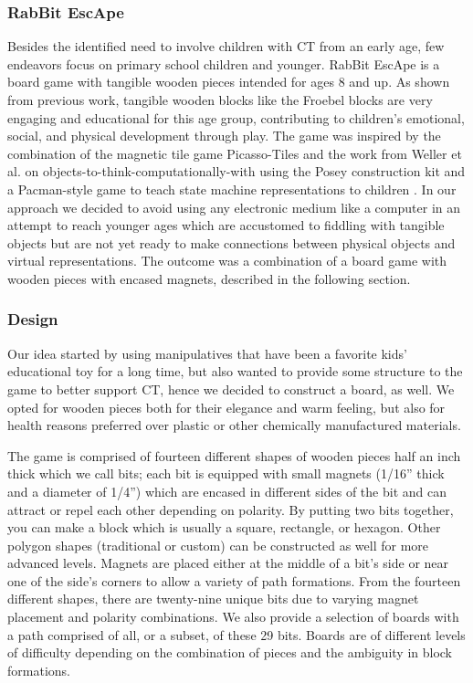 \documentclass{acm_proc_article-sp}
\begin{document}
\subsubsection{RabBit EscApe}
Besides the identified need to involve children with CT from an early age, few endeavors focus on primary school children and younger.
RabBit EscApe is a board game with tangible wooden pieces intended for ages 8 and up.
As shown from previous work, tangible wooden blocks like the Froebel blocks\cite{liebschner1992child} are very engaging and educational for this age group, contributing to children's emotional, social, and physical development through play.
The game was inspired by the combination of the magnetic tile game Picasso-Tiles\cite{picassotiles3d} and the work from Weller et al. on objects-to-think-computationally-with using the Posey construction kit and a Pacman-style game to teach state machine representations to children \cite{weller2008escape}.
In our approach we decided to avoid using any electronic medium like a computer in an attempt to reach younger ages which are accustomed to fiddling with tangible objects but are not yet ready to make connections between physical objects and virtual representations.
The outcome was a combination of a board game with wooden pieces with encased magnets, described in the following section.

\subsubsection{Design}
Our idea started by using manipulatives that have been a favorite kids' educational toy for a long time, but also wanted to provide some structure to the game to better support CT, hence we decided to construct a board, as well.
We opted for wooden pieces both for their elegance and warm feeling, but also for health reasons preferred over plastic or other chemically manufactured materials. 

The game is comprised of fourteen different shapes of wooden pieces half an inch thick which we call bits; each bit is equipped with small magnets (1/16'' thick and a diameter of 1/4'') which are encased in different sides of the bit and can attract or repel each other depending on polarity.
By putting two bits together, you can make a block which is usually a square, rectangle, or hexagon.
Other polygon shapes (traditional or custom) can be constructed as well for more advanced levels. Magnets are placed either at the middle of a bit's side or near one of the side's corners to allow a variety of path formations.
From the fourteen different shapes, there are twenty-nine unique bits due to varying magnet placement and polarity combinations. We also provide a selection of boards with a path comprised of all, or a subset, of these 29 bits.
Boards are of different levels of difficulty depending on the combination of pieces and the ambiguity in block formations.
\end{document}
